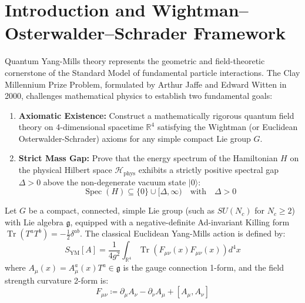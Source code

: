 \documentclass[11pt,a4paper]{article}
\theoremstyle{definition}
\begin{document}
\section{\texorpdfstring{Introduction and Wightman--Osterwalder--Schrader Framework}{Introduction and Wightman-Osterwalder-Schrader Framework}}
Quantum Yang-Mills theory represents the geometric and field-theoretic cornerstone of the Standard Model of fundamental particle interactions. The Clay Millennium Prize Problem, formulated by Arthur Jaffe and Edward Witten in 2000, challenges mathematical physics to establish two fundamental goals:
\begin{enumerate}
    \item \textbf{Axiomatic Existence:} Construct a mathematically rigorous quantum field theory on 4-dimensional spacetime $\mathbb{R}^4$ satisfying the Wightman (or Euclidean Osterwalder-Schrader) axioms for any simple compact Lie group $G$.
    \item \textbf{Strict Mass Gap:} Prove that the energy spectrum of the Hamiltonian $H$ on the physical Hilbert space $\mathcal{H}_{\mathrm{phys}}$ exhibits a strictly positive spectral gap $\Delta > 0$ above the non-degenerate vacuum state $|0\rangle$:
    \begin{equation}
    \operatorname{Spec}(H) \subseteq \{0\} \cup [\Delta, \infty) \quad \text{with} \quad \Delta > 0
    \end{equation}
\end{enumerate}

Let $G$ be a compact, connected, simple Lie group (such as $SU(N_c)$ for $N_c \ge 2$) with Lie algebra $\mathfrak{g}$, equipped with a negative-definite Ad-invariant Killing form $\operatorname{Tr}(T^a T^b) = -\frac{1}{2}\delta^{ab}$.
The classical Euclidean Yang-Mills action is defined by:
\begin{equation}
S_{\mathrm{YM}}[A] = \frac{1}{4 g^2} \int_{\mathbb{R}^4} \operatorname{Tr}\left( F_{\mu\nu}(x) F_{\mu\nu}(x) \right) d^4x
\end{equation}
where $A_\mu(x) = A_\mu^a(x) T^a \in \mathfrak{g}$ is the gauge connection 1-form, and the field strength curvature 2-form is:
\begin{equation}
F_{\mu\nu} \coloneqq \partial_\mu A_\nu - \partial_\nu A_\mu + [A_\mu, A_\nu]
\end{equation}
\end{document}
